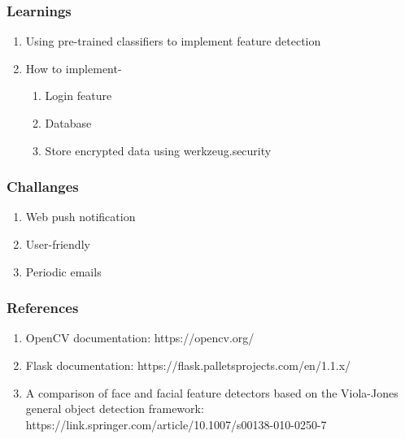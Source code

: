 \documentclass[14pt]{beamer}
\begin{document}
\begin{frame}
    \frametitle{Learnings}
    \begin{enumerate}
        \item Using pre-trained classifiers to implement feature detection
        \item How to implement-
        \begin{enumerate}
            \item Login feature
            \item Database
            \item Store encrypted data using werkzeug.security
        \end{enumerate}
    \end{enumerate}
\end{frame}
\begin{frame}
    \frametitle{Challanges}
    \begin{enumerate}
        \item Web push notification
        \item User-friendly
        \item Periodic emails
    \end{enumerate}
\end{frame}

\begin{frame}
    \frametitle{References}
    \begin{enumerate}
        \item OpenCV documentation: 
        \vspace{1in}
        https://opencv.org/
        \item Flask documentation: 
        \vspace{1in}
        https://flask.palletsprojects.com/en/1.1.x/
        \item A comparison of face and facial feature detectors based on the Viola-Jones general object detection framework: 
        \vspace{1in}
        https://link.springer.com/article/10.1007/s00138-010-0250-7
    \end{enumerate}
\end{frame}
\end{document}
